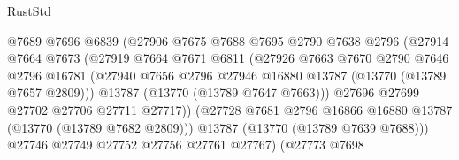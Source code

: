 \begin{lexlean}{RustStd}
\begin{coremodule}
                                  @7689
                                  @7696
                                  @6839
                                  (@27906
                                    @7675
                                    @7688
                                    @7695
                                    @2790
                                    @7638
                                    @2796
                                    (@27914
                                      @7664
                                      @7673
                                      (@27919
                                        @7664
                                        @7671
                                        @6811
                                        (@27926
                                          @7663
                                          @7670
                                          @2790
                                          @7646
                                          @2796
                                          @16781
                                          (@27940
                                            @7656
                                            @2796
                                            @27946
                                            @16880
                                            @13787
                                            (@13770 (@13789 @7657 @2809)))
                                          @13787
                                          (@13770 (@13789 @7647 @7663)))
                                        @27696
                                        @27699
                                        @27702
                                        @27706
                                        @27711
                                        @27717))
                                    (@27728
                                      @7681
                                      @2796
                                      @16866
                                      @16880
                                      @13787
                                      (@13770 (@13789 @7682 @2809)))
                                    @13787
                                    (@13770 (@13789 @7639 @7688)))
                                  @27746
                                  @27749
                                  @27752
                                  @27756
                                  @27761
                                  @27767)
                                (@27773
                                  @7698

\end{coremodule}
\end{lexlean}
